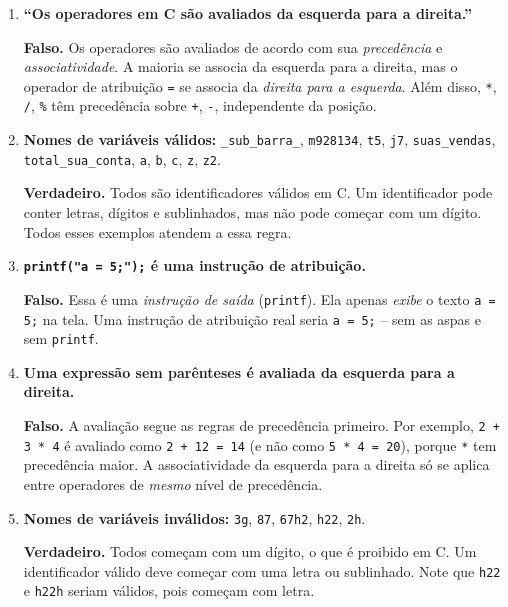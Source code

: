 \documentclass[12pt,a4paper]{article}
\begin{document}
\begin{respostabox}[title={Exercício 2.10}]
\begin{enumerate}[label=\textbf{\alph*)}]

\item \textbf{``Os operadores em C são avaliados da esquerda para a direita.''}

\textcolor{deitelred}{\textbf{Falso.}} Os operadores são avaliados de acordo com sua
\textit{precedência} e \textit{associatividade}. A maioria se associa da esquerda para
a direita, mas o operador de atribuição \texttt{=} se associa da \textit{direita para
a esquerda}. Além disso, \texttt{*}, \texttt{/}, \texttt{\%} têm precedência sobre
\texttt{+}, \texttt{-}, independente da posição.

\item \textbf{Nomes de variáveis válidos:} \texttt{\_sub\_barra\_}, \texttt{m928134},
\texttt{t5}, \texttt{j7}, \texttt{suas\_vendas}, \texttt{total\_sua\_conta}, \texttt{a},
\texttt{b}, \texttt{c}, \texttt{z}, \texttt{z2}.

\textcolor{deitelgreen}{\textbf{Verdadeiro.}} Todos são identificadores válidos em C.
Um identificador pode conter letras, dígitos e sublinhados, mas não pode começar com
um dígito. Todos esses exemplos atendem a essa regra.

\item \textbf{\texttt{printf("a = 5;");} é uma instrução de atribuição.}

\textcolor{deitelred}{\textbf{Falso.}} Essa é uma \textit{instrução de saída}
(\texttt{printf}). Ela apenas \textit{exibe} o texto \texttt{a = 5;} na tela. Uma
instrução de atribuição real seria \texttt{a = 5;} -- sem as aspas e sem \texttt{printf}.

\item \textbf{Uma expressão sem parênteses é avaliada da esquerda para a direita.}

\textcolor{deitelred}{\textbf{Falso.}} A avaliação segue as regras de precedência
primeiro. Por exemplo, \texttt{2 + 3 * 4} é avaliado como \texttt{2 + 12 = 14} (e não
como \texttt{5 * 4 = 20}), porque \texttt{*} tem precedência maior. A associatividade
da esquerda para a direita só se aplica entre operadores de \textit{mesmo} nível de
precedência.

\item \textbf{Nomes de variáveis inválidos:} \texttt{3g}, \texttt{87}, \texttt{67h2},
\texttt{h22}, \texttt{2h}.

\textcolor{deitelgreen}{\textbf{Verdadeiro.}} Todos começam com um dígito, o que é
proibido em C. Um identificador válido deve começar com uma letra ou sublinhado.
Note que \texttt{h22} e \texttt{h22h} seriam válidos, pois começam com letra.

\end{enumerate}
\end{respostabox}
\end{document}
